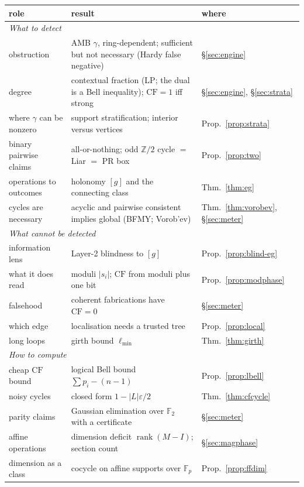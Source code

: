 \documentclass[11pt]{article}
\theoremstyle{definition}
\theoremstyle{remark}
\newcommand{\Z}{\mathbb{Z}}
\newcommand{\F}{\mathbb{F}}
\newcommand{\CF}{\mathrm{CF}}
\begin{document}
\begin{table}[!htbp]\centering\small
\begin{tabular}{p{3.9cm}p{6.6cm}p{2.9cm}}
\toprule
role & result & where\\
\midrule
\multicolumn{3}{l}{\emph{What to detect}}\\
obstruction & AMB $\gamma$, ring-dependent; sufficient but not necessary (Hardy false negative) & \S\ref{sec:engine}\\
degree & contextual fraction (LP; the dual is a Bell inequality); $\CF=1$ iff strong & \S\ref{sec:engine}, \S\ref{sec:strata}\\
where $\gamma$ can be nonzero & support stratification; interior versus vertices & Prop.~\ref{prop:strata}\\
binary pairwise claims & all-or-nothing; odd $\Z/2$ cycle $=$ Liar $=$ PR box & Prop.~\ref{prop:two}\\
operations to outcomes & holonomy $[g]$ and the connecting class & Thm.~\ref{thm:eg}\\
cycles are necessary & acyclic and pairwise consistent implies global (BFMY; Vorob'ev) & Thm.~\ref{thm:vorobev}, \S\ref{sec:meter}\\
\midrule
\multicolumn{3}{l}{\emph{What cannot be detected}}\\
information lens & Layer-2 blindness to $[g]$ & Prop.~\ref{prop:blind-eg}\\
what it does read & moduli $|s_i|$; $\CF$ from moduli plus one bit & Prop.~\ref{prop:modphase}\\
falsehood & coherent fabrications have $\CF=0$ & \S\ref{sec:meter}\\
which edge & localisation needs a trusted tree & Prop.~\ref{prop:local}\\
long loops & girth bound $\ell_{\min}$ & Thm.~\ref{thm:girth}\\
\midrule
\multicolumn{3}{l}{\emph{How to compute}}\\
cheap $\CF$ bound & logical Bell bound $\sum p_i-(n-1)$ & Prop.~\ref{prop:lbell}\\
noisy cycles & closed form $1-|L|\varepsilon/2$ & Thm.~\ref{thm:cfcycle}\\
parity claims & Gaussian elimination over $\F_2$ with a certificate & \S\ref{sec:meter}\\
affine operations & dimension deficit $\operatorname{rank}(M-I)$; section count & \S\ref{sec:magphase}\\
dimension as a class & cocycle on affine supports over $\F_p$ & Prop.~\ref{prop:ffdim}\\

\end{tabular}
\end{table}
\end{document}
